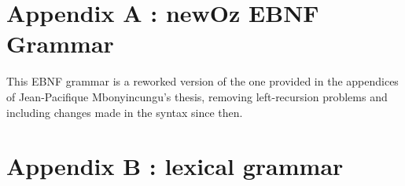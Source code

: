 
\section*{Appendix A : newOz EBNF Grammar}\label{sec:appendix-a}
This EBNF grammar is a reworked version of the one provided in the appendices of Jean-Pacifique Mbonyincungu's thesis,
removing left-recursion problems and including changes made in the syntax since then.


\section*{Appendix B : lexical grammar}\label{sec:appendix-b}
